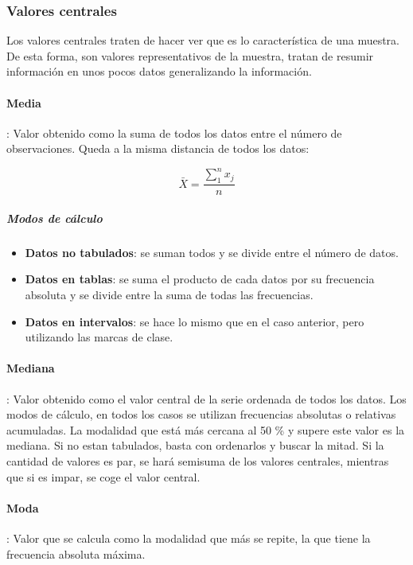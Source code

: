 \subsubsection{Valores centrales}
Los valores centrales traten de hacer ver que es lo característica de una muestra. De esta forma, son valores representativos de la muestra, tratan de resumir información en unos pocos datos generalizando la información.
\paragraph{Media}: Valor obtenido como la suma de todos los datos entre el número de observaciones. Queda a la misma distancia de todos los datos:
\begin{center}
    \begin{equation}
        \bar{X} = \dfrac{\sum_{1}^{n}x_j}{n}
    \end{equation}
\end{center}
\subparagraph{Modos de cálculo}
\begin{itemize}[itemsep=0pt,parsep=0pt,topsep=0pt,partopsep=0pt]
    \item \textbf{Datos no tabulados}: se suman todos y se divide entre el número de datos.
    \item\textbf{Datos en tablas}: se suma el producto de cada datos por su frecuencia absoluta y se divide entre la suma de todas las frecuencias.
    \item\textbf{Datos en intervalos}: se hace lo mismo que en el caso anterior, pero utilizando las marcas de clase.
\end{itemize}
\paragraph{Mediana}: Valor obtenido como el valor central de la serie ordenada de todos los datos. Los modos de cálculo, en todos los casos se utilizan frecuencias absolutas o relativas acumuladas. La modalidad que está más cercana al 50 \% y supere este valor es la mediana. Si no estan tabulados, basta con ordenarlos y buscar la mitad. Si la cantidad de valores es par, se hará semisuma de los valores centrales, mientras que si es impar, se coge el valor central.
\paragraph{Moda}: Valor que se calcula como la modalidad que más se repite, la que tiene la frecuencia absoluta máxima.
